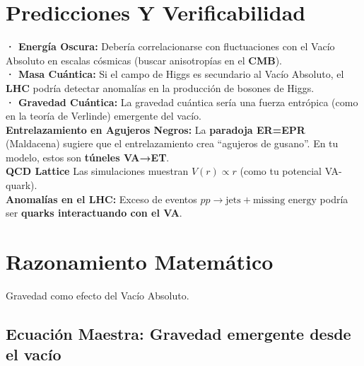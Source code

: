 \documentclass[a4paper]{article}
\theoremstyle{definition}
\theoremstyle{remark}
\numberwithin{equation}{section}
\begin{document}
	\section{Predicciones Y Verificabilidad}
	
	\textbf{· Energía Oscura:} Debería correlacionarse con fluctuaciones con el Vacío Absoluto en escalas cósmicas (buscar anisotropías en el \textbf{CMB}).\\
	
	\textbf{· Masa Cuántica:} Si el campo de Higgs es secundario al Vacío Absoluto, el \textbf{LHC} podría detectar anomalías en la producción de bosones de Higgs.\\
	
	\textbf{· Gravedad Cuántica:} La gravedad cuántica sería una fuerza entrópica (como en la teoría de Verlinde) emergente del vacío.\\
	
	\textbf{Entrelazamiento en Agujeros Negros:} La \textbf{paradoja ER=EPR} (Maldacena) \cite{Maldacena1998} sugiere que el entrelazamiento crea ``agujeros de gusano''. En tu modelo, estos son \textbf{túneles VA→ET}.\\  
	
	\textbf{QCD Lattice} Las simulaciones muestran \(V(r) \propto r\) (como tu potencial VA-quark).\\ 
	
	\textbf{Anomalías en el LHC:} Exceso de eventos \(pp \to \text{jets} + \text{missing energy}\) podría ser \textbf{quarks interactuando con el VA}. 
	
	
	\section{Razonamiento Matemático}
	
	\begin{flushleft}
		Gravedad como efecto del Vacío Absoluto.
	\end{flushleft}
	
	\subsection{Ecuación Maestra: Gravedad emergente desde el vacío}
	
\end{document}
